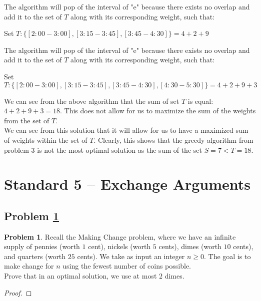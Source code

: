 \documentclass[11pt]{article}
\theoremstyle{definition}
\theoremstyle{definition}
\newtheorem{required}{Problem}
\theoremstyle{definition}
\begin{document}
The algorithm will pop of the interval of "e" because there exists no overlap and add it to the set of $T$ along with its corresponding weight, such that: \\
\begin{center}
Set $T: \{[2:00 - 3:00], [3:15 - 3:45], [3:45 - 4:30]\} = 4 + 2 + 9$\\
\end{center}
The algorithm will pop of the interval of "e" because there exists no overlap and add it to the set of $T$ along with its corresponding weight, such that: \\
\begin{center}
Set $T: \{[2:00 - 3:00], [3:15 - 3:45], [3:45 - 4:30], [4:30 - 5:30]\} = 4 + 2 + 9 + 3$\\
\end{center}
We can see from the above algorithm that the sum of set $T$ is equal: $4 + 2 + 9 + 3 = 18$. This does not allow for us to maximize the sum of the weights from the set of $T$. \\
We can see from this solution that it will allow for us to have a maximized sum of weights within the set of $T$. Clearly, this shows that the greedy algorithm from problem 3 is not the most optimal solution as the sum of the set $S = 7 < T = 18$. 


\newpage
\section{Standard 5 -- Exchange Arguments}
\setcounter{subsection}{4}
\subsection{Problem \ref{Exchange1}}
\begin{required} \label{Exchange1}
Recall the Making Change problem, where we have an infinite supply of pennies (worth $1$ cent), nickels (worth $5$ cents), dimes (worth $10$ cents), and quarters (worth $25$ cents). We take as input an integer $n \geq 0$. The goal is to make change for $n$ using the fewest number of coins possible. \\

\noindent Prove that in an optimal solution, we use at most $2$ dimes. 
\end{required}

\begin{proof}

\end{proof}
\end{document}

